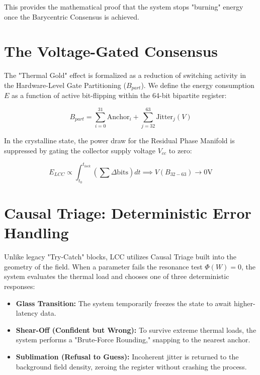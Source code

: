 \documentclass[fleqn,10pt,lineno]{wlpeerj}
\begin{document}
This provides the mathematical proof that the system stops "burning" energy once the Barycentric Consensus is achieved.

\section{The Voltage-Gated Consensus}

The "Thermal Gold" effect is formalized as a reduction of switching activity in the Hardware-Level Gate Partitioning ($B_{part}$). 
We define the energy consumption $E$ as a function of active bit-flipping within the 64-bit bipartite register:

$$B_{part} = \sum_{i=0}^{31} \text{Anchor}_i + \sum_{j=32}^{63} \text{Jitter}_j(V)$$

In the crystalline state, the power draw for the Residual Phase Manifold is suppressed by gating the collector supply voltage $V_{cc}$ to zero:

$$E_{LCC} \propto \int_{t_0}^{t_{lock}} \left( \sum \Delta \text{bits} \right) dt \implies V(B_{32-63}) \to 0\text{V}$$

\section{Causal Triage: Deterministic Error Handling}

Unlike legacy "Try-Catch" blocks, LCC utilizes Causal Triage built into the geometry of the field. When a parameter fails the resonance test $\Phi(W) = 0$, the system evaluates the thermal load and chooses one of three deterministic responses:
\begin{itemize}
\item \textbf{Glass Transition:} The system temporarily freezes the state to await higher-latency data.
\item \textbf{Shear-Off (Confident but Wrong):} To survive extreme thermal loads, the system performs a "Brute-Force Rounding," snapping to the nearest anchor.
\item \textbf{Sublimation (Refusal to Guess):} Incoherent jitter is returned to the background field density, zeroing the register without crashing the process.
\end{itemize}
\end{document}
